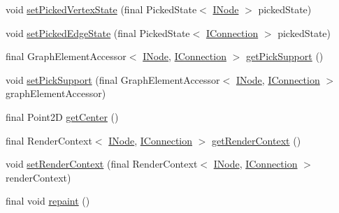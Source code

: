 \begin{DoxyCompactItemize}
\item 
void \hyperlink{classedu_1_1kit_1_1trufflehog_1_1view_1_1_network_graph_view_aa59c2de83dd035fbe1a05421736aa509}{set\+Picked\+Vertex\+State} (final Picked\+State$<$ \hyperlink{interfaceedu_1_1kit_1_1trufflehog_1_1model_1_1graph_1_1_i_node}{I\+Node} $>$ picked\+State)
\item 
void \hyperlink{classedu_1_1kit_1_1trufflehog_1_1view_1_1_network_graph_view_af9d8d7b9355bd8a120a15c26143d04ba}{set\+Picked\+Edge\+State} (final Picked\+State$<$ \hyperlink{interfaceedu_1_1kit_1_1trufflehog_1_1model_1_1graph_1_1_i_connection}{I\+Connection} $>$ picked\+State)
\item 
final Graph\+Element\+Accessor$<$ \hyperlink{interfaceedu_1_1kit_1_1trufflehog_1_1model_1_1graph_1_1_i_node}{I\+Node}, \hyperlink{interfaceedu_1_1kit_1_1trufflehog_1_1model_1_1graph_1_1_i_connection}{I\+Connection} $>$ \hyperlink{classedu_1_1kit_1_1trufflehog_1_1view_1_1_network_graph_view_af701cdcd99ff6b5fe1ada3a9f480caf0}{get\+Pick\+Support} ()
\item 
void \hyperlink{classedu_1_1kit_1_1trufflehog_1_1view_1_1_network_graph_view_a084fddd37d9942a1bb364db64df700eb}{set\+Pick\+Support} (final Graph\+Element\+Accessor$<$ \hyperlink{interfaceedu_1_1kit_1_1trufflehog_1_1model_1_1graph_1_1_i_node}{I\+Node}, \hyperlink{interfaceedu_1_1kit_1_1trufflehog_1_1model_1_1graph_1_1_i_connection}{I\+Connection} $>$ graph\+Element\+Accessor)
\item 
final Point2\+D \hyperlink{classedu_1_1kit_1_1trufflehog_1_1view_1_1_network_graph_view_abb723892b4882c98a8c540e39bda89a6}{get\+Center} ()
\item 
final Render\+Context$<$ \hyperlink{interfaceedu_1_1kit_1_1trufflehog_1_1model_1_1graph_1_1_i_node}{I\+Node}, \hyperlink{interfaceedu_1_1kit_1_1trufflehog_1_1model_1_1graph_1_1_i_connection}{I\+Connection} $>$ \hyperlink{classedu_1_1kit_1_1trufflehog_1_1view_1_1_network_graph_view_a0b894b00ea33b7f3c3dc8adb4a3e6aea}{get\+Render\+Context} ()
\item 
void \hyperlink{classedu_1_1kit_1_1trufflehog_1_1view_1_1_network_graph_view_a21ac86f8289fbef5e996df2db530c5f6}{set\+Render\+Context} (final Render\+Context$<$ \hyperlink{interfaceedu_1_1kit_1_1trufflehog_1_1model_1_1graph_1_1_i_node}{I\+Node}, \hyperlink{interfaceedu_1_1kit_1_1trufflehog_1_1model_1_1graph_1_1_i_connection}{I\+Connection} $>$ render\+Context)
\item 
final void \hyperlink{classedu_1_1kit_1_1trufflehog_1_1view_1_1_network_graph_view_aa3a842fc4db4717034370bc41e622e1c}{repaint} ()

\end{DoxyCompactItemize}
